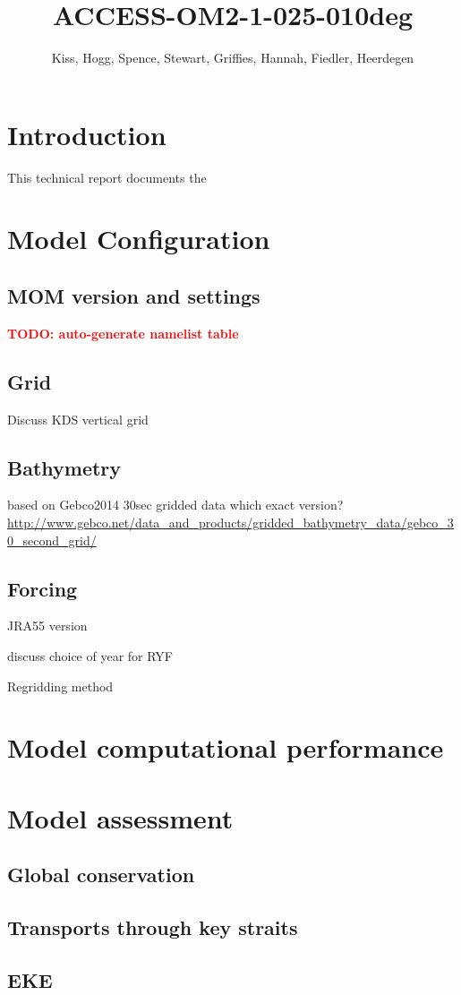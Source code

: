 \documentclass[11pt]{article}
\title{ACCESS-OM2-1-025-010deg}
\author{Kiss, Hogg, Spence, Stewart, Griffies, Hannah, Fiedler, Heerdegen}
\newcommand{\TODO}[1]{\textcolor{red}{\textbf{TODO: #1}}}
\begin{document}
\maketitle

\section{Introduction}
This technical report documents the 

\section{Model Configuration}

\subsection{MOM version and settings}
\TODO{auto-generate namelist table}

\subsection{Grid}

Discuss KDS vertical grid

\subsection{Bathymetry}
based on Gebco2014 30sec gridded data %
which exact version? \url{http://www.gebco.net/data_and_products/gridded_bathymetry_data/gebco_30_second_grid/}

\subsection{Forcing}

JRA55 version

discuss choice of year for RYF

Regridding method

\section{Model computational performance}

\section{Model assessment}

\subsection{Global conservation}

\subsection{Transports through key straits}

\subsection{EKE}
\end{document}
